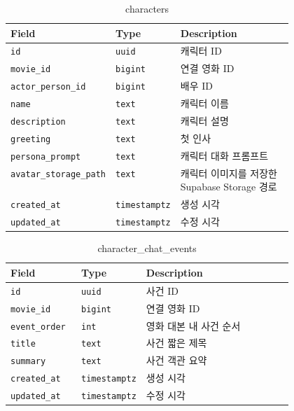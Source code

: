 \documentclass[11pt,a4paper]{article}
\renewcommand{\arraystretch}{1.18}
\begin{document}
\begin{table}[H]
\centering
\footnotesize
\setlength{\tabcolsep}{5pt}
\renewcommand{\arraystretch}{1.28}
\begin{tabularx}{\linewidth}{@{}>{\RaggedRight\arraybackslash}p{0.25\linewidth}>{\RaggedRight\arraybackslash}p{0.22\linewidth}>{\RaggedRight\arraybackslash}X@{}}
\toprule
\textbf{Field} & \textbf{Type} & \textbf{Description} \\
\midrule
\texttt{id} & \texttt{uuid} & 캐릭터 ID \\
\texttt{movie\_\allowbreak{}id} & \texttt{bigint} & 연결 영화 ID \\
\texttt{actor\_\allowbreak{}person\_\allowbreak{}id} & \texttt{bigint} & 배우 ID \\
\texttt{name} & \texttt{text} & 캐릭터 이름 \\
\texttt{description} & \texttt{text} & 캐릭터 설명 \\
\texttt{greeting} & \texttt{text} & 첫 인사 \\
\texttt{persona\_\allowbreak{}prompt} & \texttt{text} & 캐릭터 대화 프롬프트 \\
\texttt{avatar\_\allowbreak{}storage\_\allowbreak{}path} & \texttt{text} & 캐릭터 이미지를 저장한 Supabase Storage 경로 \\
\texttt{created\_\allowbreak{}at} & \texttt{timestamptz} & 생성 시각 \\
\texttt{updated\_\allowbreak{}at} & \texttt{timestamptz} & 수정 시각 \\
\bottomrule
\end{tabularx}
\caption{characters}
\end{table}

\begin{table}[H]
\centering
\footnotesize
\setlength{\tabcolsep}{5pt}
\renewcommand{\arraystretch}{1.28}
\begin{tabularx}{\linewidth}{@{}>{\RaggedRight\arraybackslash}p{0.25\linewidth}>{\RaggedRight\arraybackslash}p{0.22\linewidth}>{\RaggedRight\arraybackslash}X@{}}
\toprule
\textbf{Field} & \textbf{Type} & \textbf{Description} \\
\midrule
\texttt{id} & \texttt{uuid} & 사건 ID \\
\texttt{movie\_\allowbreak{}id} & \texttt{bigint} & 연결 영화 ID \\
\texttt{event\_\allowbreak{}order} & \texttt{int} & 영화 대본 내 사건 순서 \\
\texttt{title} & \texttt{text} & 사건 짧은 제목 \\
\texttt{summary} & \texttt{text} & 사건 객관 요약 \\
\texttt{created\_\allowbreak{}at} & \texttt{timestamptz} & 생성 시각 \\
\texttt{updated\_\allowbreak{}at} & \texttt{timestamptz} & 수정 시각 \\
\bottomrule
\end{tabularx}
\caption{character\_chat\_events}
\end{table}
\end{document}
